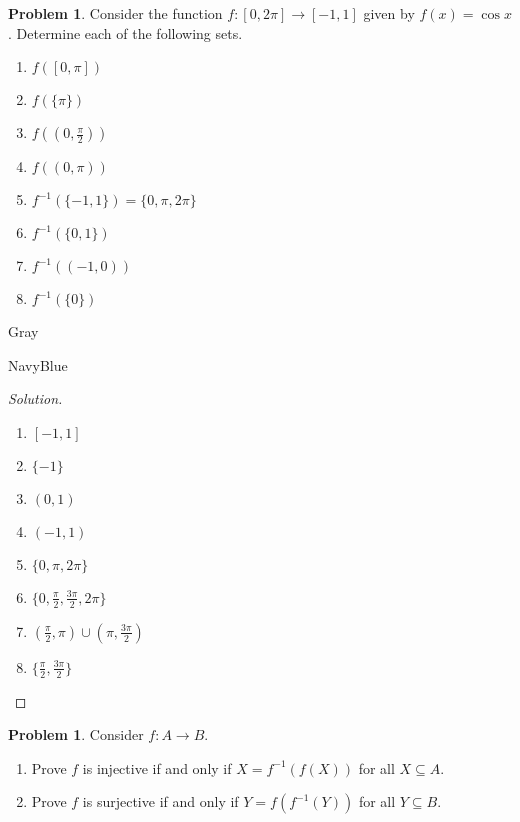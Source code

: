 \documentclass[12pt]{amsart}
\newcounter{problem_number}[section]
\theoremstyle{named}
\newenvironment{soln}
{\begin{color}{Gray}\begin{framed}\begin{color}{NavyBlue}\begin{proof}[Solution]
\doublespacing}
{\end{proof}\end{color}\end{framed}\end{color}}
\theoremstyle{definition}
\newtheorem{problem}[proposition]{Problem}
\begin{document}
\begin{problem}
	Consider the function $f\colon [0,2\pi]\to [-1,1]$ given by $f(x) = \cos x$. Determine each of the following sets.
	\begin{enumerate}
		\item $f\left([0,\pi]\right)$
		\item $f\left(\{\pi\}\right)$
		\item $f\left((0,\frac{\pi}{2})\right)$
		\item $f\left((0,\pi)\right)$
		\item $f^{-1}\left(\{-1,1\}\right) = \{0,\pi,2\pi\}$
		\item $f^{-1}\left(\{0,1\}\right)$
		\item $f^{-1}\left((-1,0)\right)$
		\item $f^{-1}\left(\{0\}\right)$
	\end{enumerate}
\end{problem}

\begin{soln}
    \phantom{ }

    \begin{enumerate}
        \item $[-1,1]$
        \item $\{-1\}$
        \item $(0,1)$
        \item $(-1,1)$
        \item $\{0,\pi,2\pi\}$
        \item $\{0,\frac{\pi}{2},\frac{3\pi}{2},2\pi\}$
        \item $(\frac{\pi}{2},\pi)\cup (\pi,\frac{3\pi}{2})$
        \item $\{\frac{\pi}{2},\frac{3\pi}{2}\}$
    \end{enumerate}
\end{soln}

\vspace{20em}

\begin{problem}
	Consider $f\colon A\to B$.
	\begin{enumerate}
		\item Prove $f$ is injective if and only if $X = f^{-1}(f(X))$ for all $X\subseteq A$.
		\item Prove $f$ is surjective if and only if $Y=f(f^{-1}(Y))$ for all $Y\subseteq B$.
	\end{enumerate}
\end{problem}
\end{document}

